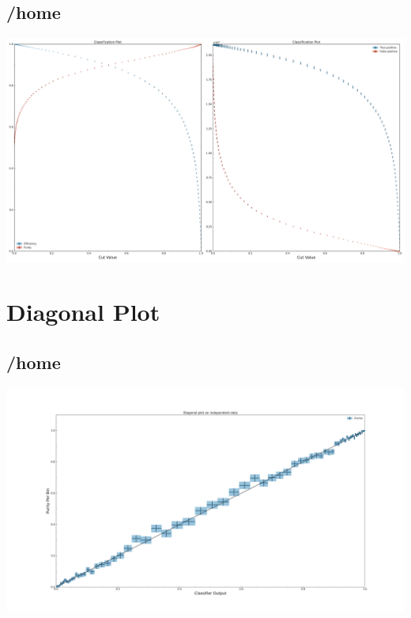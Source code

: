 \documentclass[10pt,a4paper]{article}
\begin{document}
\subsection{/home}
\begin{center}
\includegraphics[width=1\textwidth]{classification_result_-6962044671939454446.pdf}
\end{center}
\raggedbottom
\pagebreak[0]
\FloatBarrier
\section{Diagonal Plot}
\subsection{/home}
\begin{center}
\includegraphics[width=1.0\textwidth]{diagonal_plot_test.pdf}
\end{center}
\end{document}
